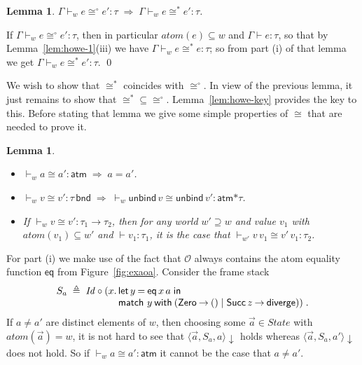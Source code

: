 \documentclass{LMCS}
\theoremstyle{plain}
\newtheorem{lemma}[thm]{Lemma}
\theoremstyle{definition}
\newcommand{\ALT}{\mathrel{\kw{|}}}
\newcommand{\atm}[1][a]{#1}
\newcommand{\ATM}{\kw{atm}}
\newcommand{\atoms}{\mathit{atom}}
\newcommand{\BINDTY}{\kw{bnd}}
\newcommand{\comp}{\circ}
\newcommand{\CON}[1][C]{\kw{#1}}
\newcommand{\config}[3]{\langle#1, #2, #3\rangle}
\newcommand{\defeq}{\triangleq}
\newcommand{\ent}{\vdash}
\newcommand{\enty}{\vdash}
\newcommand{\EQ}{\mathbin{\kw{=}}}
\newcommand{\es}{\mathit{Id}}
\renewcommand{\exp}[1][e]{#1}
\newcommand{\FUNTY}{\mathbin{\rightarrow}}
\newcommand{\imp}{\Rightarrow}
\newcommand{\IN}{\mathrel{\kw{in}}}
\newcommand{\LET}{\mathop{\kw{let}}}
\newcommand{\LP}{\mathopen{\kw{(}}}
\newcommand{\kw}[1]{\mathsf{#1}}
\newcommand{\MATCH}{\kw{match}}
\newcommand{\Obs}{\mathcal{O}}
\newcommand{\OBS}[1][obs]{\kw{#1}}
\newcommand{\ofty}{:}
\newcommand{\opeq}{\cong}
\newcommand{\opeqo}{\cong^{\circ}}
\newcommand{\PRODTY}{\mathbin{\kw{*}}}
\newcommand{\RP}{\mathclose{\kw{)}}}
\newcommand{\State}{\mathit{State}}
\newcommand{\s}[1][a]{\vec{#1}}
\newcommand{\stk}[1][S]{#1}
\newcommand{\terminates}[1][]{{\downarrow_{#1}}}
\newcommand{\TO}{\mathbin{\rightarrow}}
\newcommand{\ty}{\tau}
\newcommand{\UNBIND}{\kw{unbind}}
\newcommand{\UNITVAL}{\LP\RP}
\newcommand{\val}[1][v]{#1}
\newcommand{\vid}[1][x]{#1}
\newcommand{\w}[1][w]{#1}
\newcommand{\WITH}{\mathbin{\kw{with}}}
\begin{document}
\begin{lemma}
  \label{lem:howe-3}
  $\Gamma\ent_{\w}\exp\opeqo\exp'\ofty\ty \;\imp\;
  \Gamma\ent_{\w}\exp\opeq^*\exp'\ofty\ty$.
\end{lemma}
\proof
  If $\Gamma\ent_{\w}\exp\opeqo\exp'\ofty\ty$, then in particular
  $\atoms(\exp)\subseteq\w$ and $\Gamma\enty \exp\ofty\ty$, so that by
  Lemma~\ref{lem:howe-1}(iii) we have $\Gamma\ent_{\w} \exp \opeq^*
  \exp\ofty\ty$; so from part (i) of that lemma we get
  $\Gamma\ent_{\w} \exp \opeq^* \exp'\ofty\ty$.
\qed

We wish to show that $\opeq^*$ coincides with $\opeqo$. In view of the
previous lemma, it just remains to show that
${\opeq^*}\subseteq{\opeqo}$.  Lemma~\ref{lem:howe-key} provides the
key to this. Before stating that lemma we give some simple properties
of $\opeq$ that are needed to prove it.

\begin{lemma}
  \label{lem:howe-4}\hfill
  \begin{itemize}
  \item[(i)] ${}\ent_{\w}\atm\opeq\atm'\ofty\ATM \;\imp\; \atm=\atm'$.

  \item[(ii)] ${}\ent_{\w}\val\opeq\val'\ofty\ty\,\BINDTY \;\imp\;
    {}\ent_{\w}\UNBIND\,\val\opeq\UNBIND\,\val'\ofty\ATM\PRODTY\ty$.

  \item[(iii)] If ${}\ent_{\w}\val\opeq\val'\ofty\ty_1\FUNTY\ty_2$,
    then for any world $\w'\supseteq\w$ and value $\val_1$ with
    $\atoms(\val_1)\subseteq\w'$ and ${}\enty\val_1\ofty\ty_1$, it is
    the case that
    ${}\ent_{\w'}\val\,\val_1\opeq\val'\,\val_1\ofty\ty_2$.
  \end{itemize}
\end{lemma}
\proof
  For part (i) we make use of the fact that $\Obs$ always contains the
  atom equality function $\OBS[eq]$ from Figure~\ref{fig:exaoa}.
  Consider the frame stack
  \[
  \stk_{\atm} \;\defeq\; \es\comp(\vid.\,
  \begin{array}[t]{@{}l@{}}
    \LET {\vid[y]\EQ\OBS[eq]\,\vid\,\atm} \IN\\
    \MATCH\ \vid[y] \WITH 
    (\CON[Zero]\TO \UNITVAL\ALT \CON[Succ]\,\vid[z]\TO\DIVERGE))\;.
  \end{array}
  \]
  If $\atm\not=\atm'$ are distinct elements of $\w$, then choosing
  some $\s\in\State$ with $\atoms(\s)=\w$, it is not hard to see that
  $\config{\s}{\stk_{\atm}}{\atm}\terminates$ holds whereas
  $\config{\s}{\stk_{\atm}}{\atm'}\terminates$ does not hold. So if
  ${}\ent_{\w} \atm\opeq \atm'\ofty\ATM$ it cannot be the case that
  $\atm\not= \atm'$.
    
\end{document}
